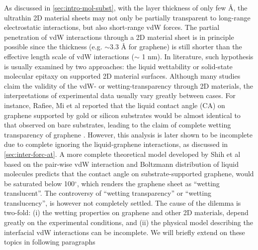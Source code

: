 As discussed in \autoref{sec:intro-mol-subst}, with the layer
thickness of only few \AA{}, the ultra\-thin 2D material sheets may
not only be partially transparent to long-range electrostatic
interactions, but also short-range vdW forces.
%
The partial penetration of vdW interactions through a 2D material
sheet is in principle possible since the thickness (e.g. $\sim{}$3.3
\AA{} for graphene) is still shorter than the effective length scale
of vdW interactions ($\sim{}$ 1 nm).
%
In literature, such hypothesis is usually examined by two approaches:
the liquid wettability or solid-state molecular epitaxy on supported
2D material surfaces.
%
Although many studies claim the validity of the vdW- or
wetting-transparency through 2D materials, the interpretations of
experimental data usually vary greatly between cases.
%
For instance, Rafiee, Mi et al reported that the liquid contact angle
(CA) on graphene supported by gold or silicon substrates would be
almost identical to that observed on bare substrates, leading to the
claim of complete wetting transparency of graphene .
%
However, this analysis is later shown to be incomplete due to complete
ignoring the liquid-graphene interactions, as discussed in
\autoref{sec:inter-forc-at}.
%
A more complete theoretical model developed by Shih et al
 based on the pair-wise vdW interaction and Boltzmann
distribution of liquid molecules predicts that the contact angle on
substrate-supported graphene, would be saturated below 100$^{\circ}$,
which renders the graphene sheet as ``wetting translucent''.
%
The controversy of ``wetting transparency'' or ``wetting
translucency'', is however not completely settled.
%
The cause of the dilemma is two-fold: (i) the wetting properties on
graphene and other 2D materials, depend greatly on the experimental
conditions, and (ii) the physical model describing the interfacial vdW
interactions can be incomplete. We will briefly extend on these topics
in following paragraphs

